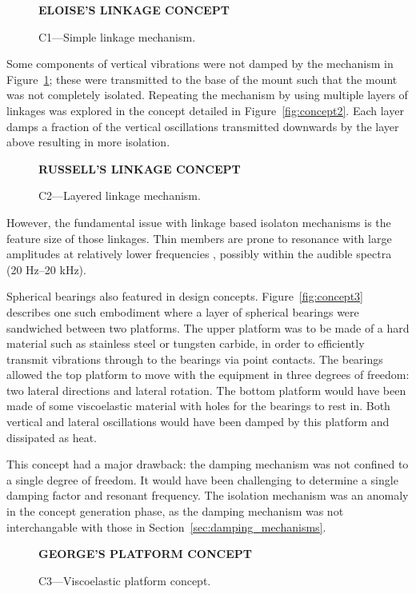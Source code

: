 \documentclass[11pt]{article}
\begin{document}
\begin{figure}[h] 
    \centering
    \textbf{ELOISE'S LINKAGE CONCEPT}
    \caption{C1---Simple linkage mechanism.}
    \label{fig:concept1}
\end{figure}

Some components of vertical vibrations were not damped by the mechanism in 
Figure~\ref{fig:concept1}; these were transmitted to the base of the mount such 
that the mount was not completely isolated. Repeating the mechanism by using 
multiple layers of linkages was explored in the concept detailed in 
Figure~\vref{fig:concept2}. Each layer damps a fraction of the vertical 
oscillations transmitted downwards by the layer above resulting in more 
isolation.

\begin{figure}[h]
    \centering
    \textbf{RUSSELL'S LINKAGE CONCEPT}
    \caption{C2---Layered linkage mechanism.}
    \label{fig:concept2}
\end{figure}

However, the fundamental issue with linkage based isolaton mechanisms is the 
feature size of those linkages. Thin members are prone to resonance with large 
amplitudes at relatively lower frequencies \cite{citation needed}, possibly 
within the audible spectra (20 Hz--20 kHz).

Spherical bearings also featured in design concepts. Figure~\vref{fig:concept3}
describes one such embodiment where a layer of spherical bearings were
sandwiched between two platforms. The upper platform was to be made of a hard 
material such as stainless steel or tungsten carbide, in order to efficiently 
transmit vibrations through to the bearings via point contacts. The bearings 
allowed the top platform to move with the equipment in three degrees of 
freedom: two lateral directions and lateral rotation. The bottom platform would 
have been made of some viscoelastic material with holes for the bearings to 
rest in. Both vertical and lateral oscillations would have been damped by this 
platform and dissipated as heat.

This concept had a major drawback: the damping mechanism was not confined to a 
single degree of freedom. It would have been challenging to determine a single 
damping factor and resonant frequency. The isolation mechanism was an anomaly 
in the concept generation phase, as the damping mechanism was not 
interchangable with those in Section~\vref{sec:damping_mechanisms}.

\begin{figure}[h]
    \centering
    \textbf{GEORGE'S PLATFORM CONCEPT}
    \caption{C3---Viscoelastic platform concept.}
    \label{fig:concept3}
\end{figure}
\end{document}
